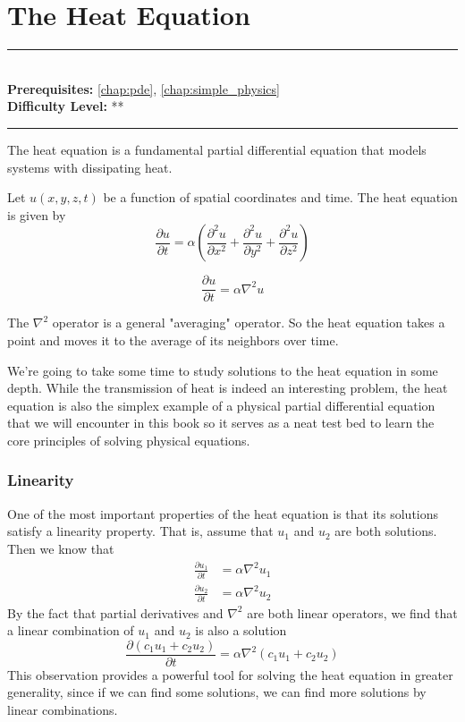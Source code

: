 \documentclass[book.tex]{subfiles}
\begin{document}
\chapter{The Heat Equation}

\label{chap:heat_equation}
\noindent\rule{11cm}{0.4pt} \\
\textbf{Prerequisites:} \autoref{chap:pde}, \autoref{chap:simple_physics} \\
\textbf{Difficulty Level:} ** \\
\noindent\rule{11cm}{0.4pt}
\vspace{5mm}
The heat equation is a fundamental partial differential equation that models systems with dissipating heat.

Let $u(x,y,z,t)$ be a function of spatial coordinates and time. The heat equation is given by
\begin{equation}
    \frac{\partial u}{\partial t} = \alpha \left ( \frac{\partial^2 u}{\partial x^2} + \frac{\partial^2 u}{\partial y^2} + \frac{\partial^2 u}{\partial z^2} \right )
\end{equation}

\begin{equation}
    \frac{\partial u}{\partial t} = \alpha \nabla^2 u
\end{equation}

The $\nabla^2$ operator is a general "averaging" operator. So the heat equation takes a point and moves it to the average of its neighbors over time.

We're going to take some time to study solutions to the heat equation in some depth. While the transmission of heat is indeed an interesting problem, the heat equation is also the simplex example of a physical partial differential equation that we will encounter in this book so it serves as a neat test bed to learn the core principles of solving physical equations.

\subsection{Linearity}
One of the most important properties of the heat equation is that its solutions satisfy a linearity property. That is, assume that $u_1$ and $u_2$ are both solutions. Then we know that 
\begin{align}
    \frac{\partial u_1}{\partial t} &= \alpha \nabla^2 u_1 \\
    \frac{\partial u_2}{\partial t} &= \alpha \nabla^2 u_2 
\end{align}
By the fact that partial derivatives and $\nabla^2$ are both linear operators, we find that a linear combination of $u_1$ and $u_2$ is also a solution
\begin{equation}
    \frac{\partial (c_1 u_1 + c_2 u_2)}{\partial t} = \alpha \nabla^2(c_1 u_1 + c_2 u_2)
\end{equation}
This observation provides a powerful tool for solving the heat equation in greater generality, since if we can find some solutions, we can find more solutions by linear combinations.
\end{document}
